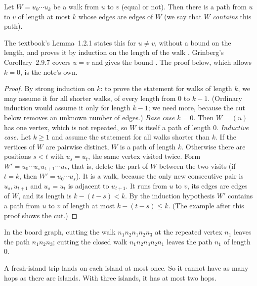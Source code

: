 \begin{lemma}\label{lem:cut}
Let $W=u_0\cdots u_k$ be a walk from $u$ to $v$ (equal or not). Then there
is a path from $u$ to $v$ of length at most $k$ whose edges are edges of
$W$ (we say that $W$ \emph{contains} this path).
\end{lemma}
The textbook's Lemma~1.2.1 states this for $u\ne v$, without a bound on
the length, and proves it by induction on the length of the walk
\cite[Lemma~1.2.1, p.~23]{petrosyan2015graphs}. Grinberg's
Corollary~2.9.7 covers $u=v$ and gives the bound
\cite[p.~39]{grinberg2025graph}. The proof below, which allows $k=0$, is the
note's own.
\begin{proof}
By strong induction on $k$: to prove the statement for walks of length $k$,
we may assume it for all shorter walks, of every length from $0$ to
$k-1$. (Ordinary induction would assume it only for length $k-1$; we need
more, because the cut below removes an unknown number of edges.)
\emph{Base case $k=0$.} Then $W=(u)$ has one vertex, which is not repeated,
so $W$ is itself a path of length $0$.
\emph{Inductive case.} Let $k\ge 1$ and assume the statement for all walks
shorter than $k$. If the vertices of $W$ are pairwise distinct, $W$ is a
path of length $k$. Otherwise there are positions $s<t$ with $u_s=u_t$,
the same vertex visited twice. Form $W'=u_0\cdots u_su_{t+1}\cdots u_k$,
that is, delete the part of $W$ between the two visits (if $t=k$, then
$W'=u_0\cdots u_s$). It is a walk, because the only new consecutive pair is
$u_s,u_{t+1}$ and $u_s=u_t$ is adjacent to $u_{t+1}$. It runs from $u$ to
$v$, its edges are edges of $W$, and its length is $k-(t-s)<k$. By the
induction hypothesis $W'$ contains a path from $u$ to $v$ of length at most
$k-(t-s)\le k$. (The example after this proof shows the cut.)
\end{proof}

\begin{example}
In the board graph, cutting the walk $n_1n_2n_1n_2n_3$ at the repeated
vertex $n_1$ leaves the path $n_1n_2n_3$; cutting the closed walk
$n_1n_2n_3n_2n_1$ leaves the path $n_1$ of length $0$.
\end{example}

\plainwords{} A fresh-island trip lands on each island at most once. So it
cannot have as many hops as there are islands. With three islands, it has
at most two hops.

